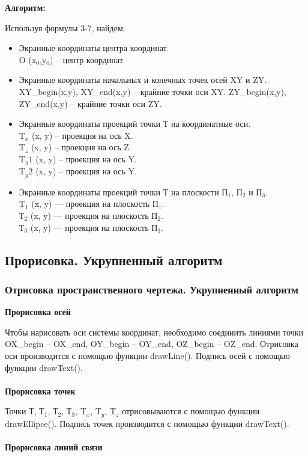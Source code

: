 \documentclass[13pt]{extarticle}
\begin{document}
\textbf{Алгоритм:}

Используя формулы 3-7, найдем:
	\begin{itemize}
		\item Экранные координаты центра координат.\\
O (x$_0$,y$_0$) -- центр координат
		\item Экранные координаты начальных и конечных точек осей XY и ZY.
	XY\_begin(x,y), XY\_end(x,y) -- крайние точки оси XY.
	ZY\_begin(x,y), ZY\_end(x,y) -- крайние точки оси ZY.
		\item Экранные координаты проекций точки Т на координатные оси.\\
	T$_x$ (x, y) -- проекция на ось X.\\
	T$_z$ (x, y) -- проекция на ось Z.\\
	T$_y1$ (x, y) -- проекция на ось Y.\\
	T$_y2$ (x, y) -- проекция на ось Y.  
		\item Экранные координаты проекций точки Т на плоскости П$_1$, П$_2$ и П$_3$.\\
	T$_1$ (x, y) — проекция на плоскость П$_1$.\\
	Т$_2$ (x, y) — проекция на плоскость П$_2$.\\
	Т$_3$ (x, y) — проекция на плоскость П$_3$.\\
	\end{itemize}
	
	
\subsection{Прорисовка. Укрупненный алгоритм}
\subsubsection{Отрисовка пространственного чертежа. Укрупненный алгоритм}
\textbf{Прорисовка осей}

Чтобы нарисовать оси системы координат, необходимо соединить линиями точки OX\_begin -- OX\_end, OY\_begin -- OY\_end, OZ\_begin -- OZ\_end. Отрисовка оси производится с помощью функции drawLine(). Подпись осей с помощью функции drawText().\\
\\
\textbf{Прорисовка точек}

Точки Т, Т$_1$, Т$_2$, Т$_3$, T$_x$, T$_y$, T$_z$ отрисовываются с помощью функции drawEllipce(). Подпись точек производится с помощью функции drawText().\\
\\
\textbf{Прорисовка линий связи}
\end{document}
